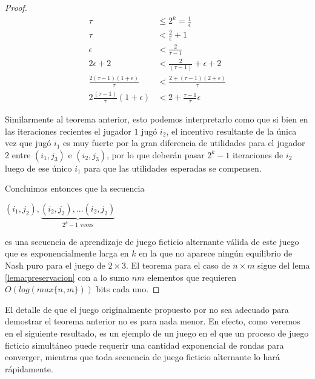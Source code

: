 \begin{proof}
    \begin{align*}
        \tau                        &\le 2^k = \frac{1}{\epsilon} \\
        \tau                        &< \frac{2}{\epsilon} + 1 \\
        \epsilon                    &< \frac{2}{\tau - 1}  \\
        2 \epsilon + 2              &< \frac{2}{(\tau - 1)} + \epsilon + 2 \\
        \frac{2(\tau - 1)(1 + \epsilon)}{\tau} &< \frac{2 + (\tau - 1) (2 + \epsilon)}{\tau} \\
        2\frac{(\tau - 1)}{\tau}(1 + \epsilon) &< 2+\frac{\tau-1}{\tau}\epsilon
    \end{align*}

    Similarmente al teorema anterior, esto podemos interpretarlo como que si bien en las iteraciones recientes el jugador $1$ jugó $i_2$, el incentivo resultante de la única vez que jugó $i_1$ es muy fuerte por la gran diferencia de utilidades para el jugador $2$ entre $(i_1, j_3)$ e $(i_2, j_3)$, por lo que deberán pasar $2^{k}-1$ iteraciones de $i_2$ luego de ese único $i_1$ para que las utilidades esperadas se compensen.

    Concluimos entonces que la secuencia

    \begin{center}
    \begin{math}
        (i_1, j_2), \underbrace{(i_2, j_2), ... (i_2, j_2)}_{\text{$2^k - 1$ veces}}
    \end{math}
    \end{center}
    es una secuencia de aprendizaje de juego ficticio alternante válida de este juego que es exponencialmente larga en $k$ en la que no aparece ningún equilibrio de Nash puro para el juego de $2 \times 3$. El teorema para el caso de $n \times m$ sigue del lema \ref{lema:preservacion} con a lo sumo $nm$ elementos que requieren $O(log(max\{n,m\}))$ bits cada uno.
\end{proof}

El detalle de que el juego originalmente propuesto por \cite{brandt:rate:convergence} no sea adecuado para demostrar el teorema anterior no es para nada menor. En efecto, como veremos en el siguiente resultado, es un ejemplo de un juego en el que un proceso de juego ficticio simultáneo puede requerir una cantidad exponencial de rondas para converger, mientras que toda secuencia de juego ficticio alternante lo hará rápidamente.


